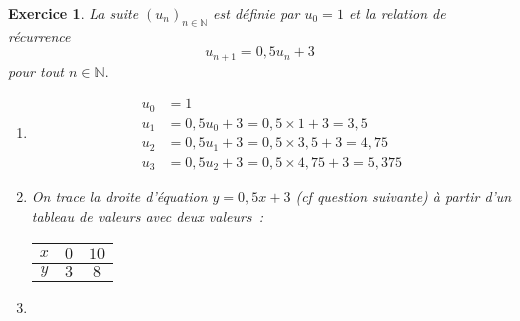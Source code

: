 \documentclass[10pt]{article}
\newtheorem{exo}{Exercice}
\begin{document}
 \begin{exo}
 
 La suite $(u_n)_{n\in\mathbb{N}}$ est définie par $u_0=1$ et la relation de récurrence \[u_{n+1}=0,5u_n+3\] pour tout $n\in\mathbb{N}.$


\begin{enumerate}
\item \begin{align*}
u_0&=1\\
u_1&=0,5u_0+3=0,5\times 1+3=3,5\\
u_2&=0,5u_1+3=0,5\times 3,5+3=4,75\\
u_3&=0,5u_2+3=0,5\times 4,75+3=5,375
\end{align*}
\item On trace la droite d'équation $y=0,5x+3$ (cf question suivante) à partir d'un tableau de valeurs avec deux valeurs~:


\begin{center}
\begin{tabular}{|c|c|c|}\hline
$x$ & $0$ & $10$\\ \hline
$y$ & $3$ & $8$\\ \hline
\end{tabular}
\end{center}

\item ~{}


\end{enumerate}
\end{exo}
\end{document}
